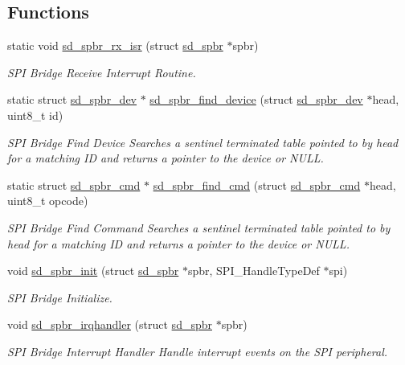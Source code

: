 \subsection*{Functions}
\begin{DoxyCompactItemize}
\item 
static void \mbox{\hyperlink{group___s_d___s_p_i___bridge_ga303d9b609ad91e21cf2d9ae010dc620d}{sd\+\_\+spbr\+\_\+rx\+\_\+isr}} (struct \mbox{\hyperlink{structsd__spbr}{sd\+\_\+spbr}} $\ast$spbr)
\begin{DoxyCompactList}\small\item\em S\+PI Bridge Receive Interrupt Routine. \end{DoxyCompactList}\item 
static struct \mbox{\hyperlink{structsd__spbr__dev}{sd\+\_\+spbr\+\_\+dev}} $\ast$ \mbox{\hyperlink{group___s_d___s_p_i___bridge_gaf2de23902fa458c64da619f83a31d7ec}{sd\+\_\+spbr\+\_\+find\+\_\+device}} (struct \mbox{\hyperlink{structsd__spbr__dev}{sd\+\_\+spbr\+\_\+dev}} $\ast$head, uint8\+\_\+t id)
\begin{DoxyCompactList}\small\item\em S\+PI Bridge Find Device Searches a sentinel terminated table pointed to by head for a matching ID and returns a pointer to the device or N\+U\+LL. \end{DoxyCompactList}\item 
static struct \mbox{\hyperlink{structsd__spbr__cmd}{sd\+\_\+spbr\+\_\+cmd}} $\ast$ \mbox{\hyperlink{group___s_d___s_p_i___bridge_ga2b5f70f500fea4bd4b79b8788ba6e03d}{sd\+\_\+spbr\+\_\+find\+\_\+cmd}} (struct \mbox{\hyperlink{structsd__spbr__cmd}{sd\+\_\+spbr\+\_\+cmd}} $\ast$head, uint8\+\_\+t opcode)
\begin{DoxyCompactList}\small\item\em S\+PI Bridge Find Command Searches a sentinel terminated table pointed to by head for a matching ID and returns a pointer to the device or N\+U\+LL. \end{DoxyCompactList}\item 
void \mbox{\hyperlink{group___s_d___s_p_i___bridge_gaea5b9346a7e4095cda1e056ca703ef89}{sd\+\_\+spbr\+\_\+init}} (struct \mbox{\hyperlink{structsd__spbr}{sd\+\_\+spbr}} $\ast$spbr, S\+P\+I\+\_\+\+Handle\+Type\+Def $\ast$spi)
\begin{DoxyCompactList}\small\item\em S\+PI Bridge Initialize. \end{DoxyCompactList}\item 
void \mbox{\hyperlink{group___s_d___s_p_i___bridge_ga0ce7728ffce92e9931c22b9c54675ca7}{sd\+\_\+spbr\+\_\+irqhandler}} (struct \mbox{\hyperlink{structsd__spbr}{sd\+\_\+spbr}} $\ast$spbr)
\begin{DoxyCompactList}\small\item\em S\+PI Bridge Interrupt Handler Handle interrupt events on the S\+PI peripheral. \end{DoxyCompactList}\end{DoxyCompactItemize}
